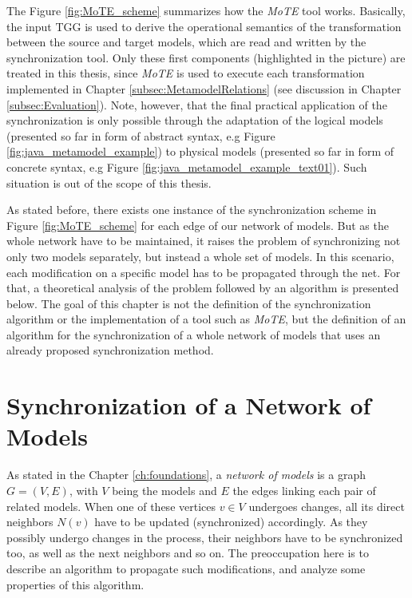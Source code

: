 \documentclass[tuberlin,cic,tc,english,noabntcite, oneside]{iiufrgs}
\begin{document}
The Figure \ref{fig:MoTE_scheme} summarizes how the \emph{MoTE} tool works. Basically, the input TGG is used to derive the operational semantics of the transformation between the source and target models, which are read and written by the synchronization tool. Only these first components (highlighted in the picture) are treated in this thesis, since \emph{MoTE} is used to execute each transformation implemented in Chapter \ref{subsec:MetamodelRelations} (see discussion in Chapter \ref{subsec:Evaluation}). Note, however, that the final practical application of the synchronization is only possible through the adaptation of the logical models (presented so far in form of abstract syntax, e.g Figure \ref{fig:java_metamodel_example}) to physical models (presented so far in form of concrete syntax, e.g Figure \ref{fig:java_metamodel_example_text01}). Such situation is out of the scope of this thesis. 

As stated before, there exists one instance of the synchronization scheme in Figure \ref{fig:MoTE_scheme} for each edge of our network of models. But as the whole network have to be maintained, it raises the problem of synchronizing not only two models separately, but instead a whole set of models. In this scenario, each modification on a specific model has to be propagated through the net. For that, a theoretical analysis of the problem followed by an algorithm is presented below. The goal of this chapter is not the definition of the synchronization algorithm or the implementation of a tool such as \emph{MoTE}, but the definition of an algorithm for the synchronization of a whole network of models that uses an already proposed synchronization method.

\section{Synchronization of a Network of Models}
As stated in the Chapter \ref{ch:foundations}, a \emph{network of models} is a graph $G = (V,E)$, with $V$ being the models and $E$ the edges linking each pair of related models. When one of these vertices $v \in V$ undergoes changes, all its direct neighbors $N(v)$ have to be updated (synchronized) accordingly. As they possibly undergo changes in the process, their neighbors have to be synchronized too, as well as the next neighbors and so on. The preoccupation here is to describe an algorithm to propagate such modifications, and analyze some properties of this algorithm.
\end{document}
